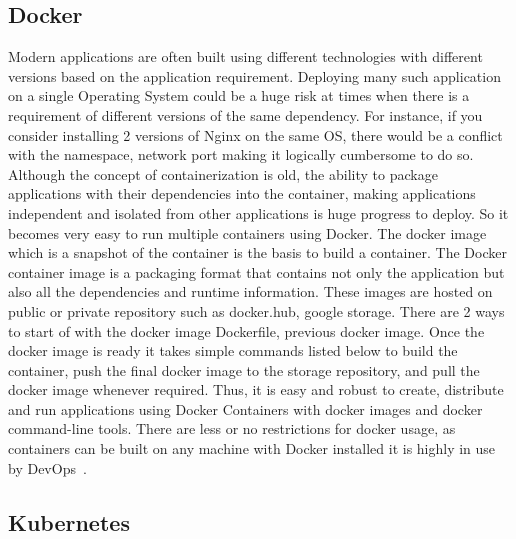 \subsection{Docker}

Modern applications are often built using different technologies with
different versions based on the application requirement. Deploying
many such application on a single Operating System could be a huge
risk at times when there is a requirement of different versions of the
same dependency. For instance, if you consider installing 2 versions
of Nginx on the same OS, there would be a conflict with the namespace,
network port making it logically cumbersome to do so. Although the
concept of containerization is old, the ability to package
applications with their dependencies into the container, making
applications independent and isolated from other applications is huge
progress to deploy. So it becomes very easy to run multiple containers
using Docker. The docker image which is a snapshot of the container is
the basis to build a container. The Docker container image is a
packaging format that contains not only the application but also all
the dependencies and runtime information. These images are hosted on
public or private repository such as docker.hub, google storage.
There are 2 ways to start of with the docker image Dockerfile,
previous docker image. Once the docker image is ready it takes simple
commands listed below to build the container, push the final docker
image to the storage repository, and pull the docker image whenever
required. Thus, it is easy and robust to create, distribute and run
applications using Docker Containers with docker images and docker
command-line tools. There are less or no restrictions for docker
usage, as containers can be built on any machine with Docker installed
it is highly in use by DevOps~\cite{hid-sp18-602-docker}.

\subsection{Kubernetes}

